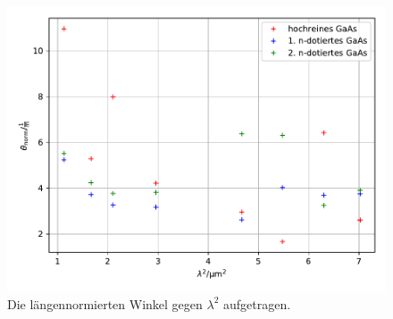 \begin{figure}
  \centering
  \includegraphics[scale=0.5]{b.pdf}
  \caption{Die längennormierten Winkel gegen $\lambda ^2$ aufgetragen.}
  \label{fig:3}
\end{figure}
